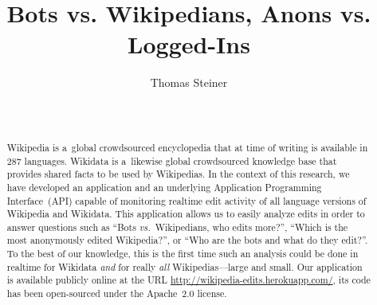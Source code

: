 \documentclass{sig-alternate}
\newcommand{\inlinelistingsize}{\fontsize{8pt}{11pt}}
\let\oldurl\url
\renewcommand{\url}[1]{\inlinelistingsize\oldurl{#1}}
\begin{document}
%

\title{Bots vs. Wikipedians, Anons vs. Logged-Ins}


\author{
\alignauthor
Thomas Steiner\\
       \\
       \\
}

\maketitle
\begin{abstract}
Wikipedia is a~global crowdsourced encyclopedia
that at time of writing is available in 287 languages.
Wikidata is a~likewise global crowdsourced knowledge base
that provides shared facts to be used by Wikipedias.
In the context of this research, we have developed
an application and an underlying
Application Programming Interface~(API) capable of monitoring
realtime edit activity of all language versions
of Wikipedia and Wikidata.
This application allows us to easily analyze edits
in order to answer questions such as
``Bots \emph{vs.}\ Wikipedians, who edits more?'',
``Which is the most anonymously edited Wikipedia?'',
or ``Who are the bots and what do they edit?''.
To the best of our knowledge,
this is the first time such an analysis
could be done in realtime for Wikidata \emph{and}
for really \emph{all} Wikipedias---large and small.
Our application is available publicly online at the URL
\url{http://wikipedia-edits.herokuapp.com/},
its code has been open-sourced under the Apache~2.0 license.
\end{abstract}



\end{document}

